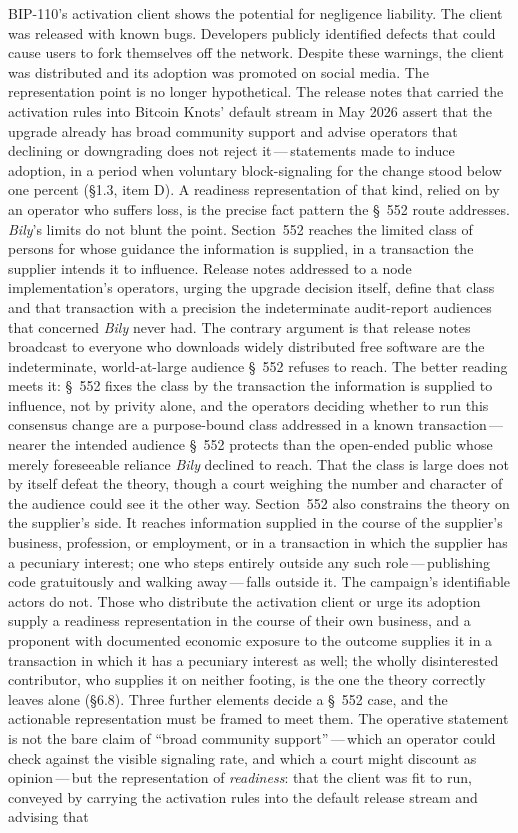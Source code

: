 \documentclass[11pt, twoside, openright]{book}
\newcommand{\sect}[1]{\S#1}
\begin{document}
BIP-110's activation client shows the potential for negligence liability. The client was released with known bugs. Developers publicly identified defects that could cause users to fork themselves off the network. Despite these warnings, the client was distributed and its adoption was promoted on social media. The representation point is no longer hypothetical. The release notes that carried the activation rules into Bitcoin Knots' default stream in May 2026 assert that the upgrade already has broad community support and advise operators that declining or downgrading does not reject it\,---\,statements made to induce adoption, in a period when voluntary block-signaling for the change stood below one percent (\sect{1.3}, item D). A readiness representation of that kind, relied on by an operator who suffers loss, is the precise fact pattern the \S~552 route addresses. \textit{Bily}'s limits do not blunt the point. Section~552 reaches the limited class of persons for whose guidance the information is supplied, in a transaction the supplier intends it to influence. Release notes addressed to a node implementation's operators, urging the upgrade decision itself, define that class and that transaction with a precision the indeterminate audit-report audiences that concerned \textit{Bily} never had. The contrary argument is that release notes broadcast to everyone who downloads widely distributed free software are the indeterminate, world-at-large audience \S~552 refuses to reach. The better reading meets it: \S~552 fixes the class by the transaction the information is supplied to influence, not by privity alone, and the operators deciding whether to run this consensus change are a purpose-bound class addressed in a known transaction\,---\,nearer the intended audience \S~552 protects than the open-ended public whose merely foreseeable reliance \textit{Bily} declined to reach. That the class is large does not by itself defeat the theory, though a court weighing the number and character of the audience could see it the other way. Section~552 also constrains the theory on the supplier's side. It reaches information supplied in the course of the supplier's business, profession, or employment, or in a transaction in which the supplier has a pecuniary interest; one who steps entirely outside any such role\,---\,publishing code gratuitously and walking away\,---\,falls outside it. The campaign's identifiable actors do not. Those who distribute the activation client or urge its adoption supply a readiness representation in the course of their own business, and a proponent with documented economic exposure to the outcome supplies it in a transaction in which it has a pecuniary interest as well; the wholly disinterested contributor, who supplies it on neither footing, is the one the theory correctly leaves alone (\sect{6.8}). Three further elements decide a \S~552 case, and the actionable representation must be framed to meet them. The operative statement is not the bare claim of ``broad community support''\,---\,which an operator could check against the visible signaling rate, and which a court might discount as opinion\,---\,but the representation of \textit{readiness}: that the client was fit to run, conveyed by carrying the activation rules into the default release stream and advising that 
\end{document}
